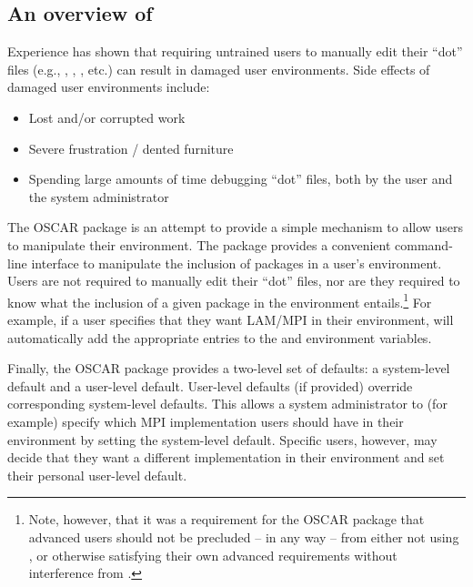 %
%
%
%

\subsection{An overview of }
\label{app:switcher-overview}

Experience has shown that requiring untrained users to manually edit
their ``dot'' files (e.g., ,
, , etc.) can result in
damaged user environments.  Side effects of damaged user environments
include:

\begin{itemize}
\item Lost and/or corrupted work
\item Severe frustration / dented furniture
\item Spending large amounts of time debugging ``dot'' files, both by
  the user and the system administrator
\end{itemize}

The OSCAR  package is an attempt to provide a simple
mechanism to allow users to manipulate their environment.  The
 package provides a convenient command-line interface to
manipulate the inclusion of packages in a user's environment.  Users
are not required to manually edit their ``dot'' files, nor are they
required to know what the inclusion of a given package in the
environment entails.\footnote{Note, however, that it was a requirement
  for the OSCAR  package that advanced users should not
  be precluded -- in any way -- from either not using ,
  or otherwise satisfying their own advanced requirements without
  interference from .}  For example, if a user specifies
that they want LAM/MPI in their environment,  will
automatically add the appropriate entries to the  and
 environment variables.

Finally, the OSCAR  package provides a two-level set of
defaults: a system-level default and a user-level default.  User-level
defaults (if provided) override corresponding system-level defaults.
This allows a system administrator to (for example) specify which MPI
implementation users should have in their environment by setting the
system-level default.  Specific users, however, may decide that they
want a different implementation in their environment and set their
personal user-level default.

